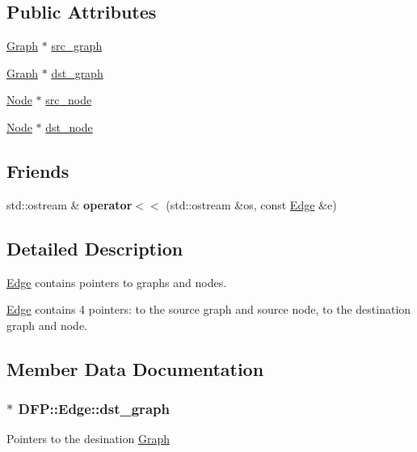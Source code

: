 \subsection*{Public Attributes}
\begin{DoxyCompactItemize}
\item 
\hyperlink{class_d_f_p_1_1_graph}{Graph} $\ast$ \hyperlink{class_d_f_p_1_1_edge_a993e651548528b8cc2029d777cf2a881}{src\+\_\+graph}
\item 
\hyperlink{class_d_f_p_1_1_graph}{Graph} $\ast$ \hyperlink{class_d_f_p_1_1_edge_a4f4d043502fb5a3438652bf3fce09273}{dst\+\_\+graph}
\item 
\hyperlink{class_d_f_p_1_1_node}{Node} $\ast$ \hyperlink{class_d_f_p_1_1_edge_a76f03300ad177e767033229d0fc1a780}{src\+\_\+node}
\item 
\hyperlink{class_d_f_p_1_1_node}{Node} $\ast$ \hyperlink{class_d_f_p_1_1_edge_a1c2dd4ca03c0dfa002a2d07dc738cfaa}{dst\+\_\+node}
\end{DoxyCompactItemize}
\subsection*{Friends}
\begin{DoxyCompactItemize}
\item 
std\+::ostream \& {\bfseries operator$<$$<$} (std\+::ostream \&os, const \hyperlink{class_d_f_p_1_1_edge}{Edge} \&e)\hypertarget{class_d_f_p_1_1_edge_aa1b374eb64c6c754621b4fc918a9df57}{}\label{class_d_f_p_1_1_edge_aa1b374eb64c6c754621b4fc918a9df57}

\end{DoxyCompactItemize}


\subsection{Detailed Description}
\hyperlink{class_d_f_p_1_1_edge}{Edge} contains pointers to graphs and nodes. 

\hyperlink{class_d_f_p_1_1_edge}{Edge} contains 4 pointers\+: to the source graph and source node, to the destination graph and node. 

\subsection{Member Data Documentation}
\subsubsection[{\texorpdfstring{dst\+\_\+graph}{dst_graph}}]{$\ast$ D\+F\+P\+::\+Edge\+::dst\+\_\+graph}\hypertarget{class_d_f_p_1_1_edge_a4f4d043502fb5a3438652bf3fce09273}{}\label{class_d_f_p_1_1_edge_a4f4d043502fb5a3438652bf3fce09273}
Pointers to the desination \hyperlink{class_d_f_p_1_1_graph}{Graph} 
